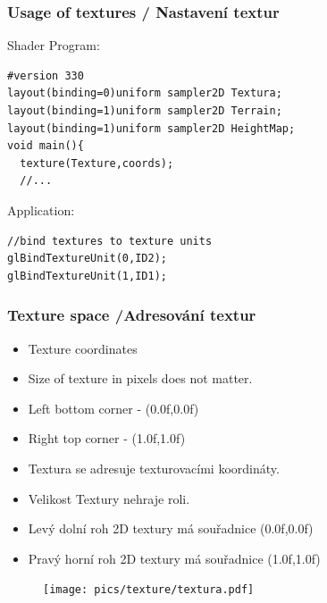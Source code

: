 \begin{frame}[fragile]\frametitle{Usage of textures / Nastavení textur}
Shader Program:
{\scriptsize
\begin{verbatim}
#version 330
layout(binding=0)uniform sampler2D Textura;
layout(binding=1)uniform sampler2D Terrain;
layout(binding=1)uniform sampler2D HeightMap;
void main(){
  texture(Texture,coords);
  //...
\end{verbatim}
}
Application:
{\scriptsize
\begin{verbatim}
//bind textures to texture units
glBindTextureUnit(0,ID2);
glBindTextureUnit(1,ID1);
\end{verbatim}
}
\end{frame}

\begin{frame}[fragile]\frametitle{Texture space /Adresování textur}
	\begin{itemize}
	\item Texture coordinates
	\item Size of texture in pixels does not matter.
	\item Left bottom corner - (0.0f,0.0f)
	\item Right top corner - (1.0f,1.0f)
	\end{itemize}

	\begin{itemize}
	\item Textura se adresuje texturovacími koordináty.
	\item Velikost Textury nehraje roli.
	\item Levý dolní roh 2D textury má souřadnice (0.0f,0.0f)
	\item Pravý horní roh 2D textury má souřadnice (1.0f,1.0f)
	\end{itemize}
	\begin{figure}[h]
		\texttt{[image: pics/texture/textura.pdf]}
	\end{figure}
\end{frame}

